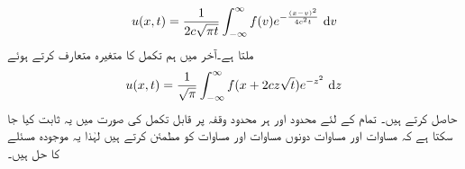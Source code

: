 \begin{align}\label{مساوات_جزوی_لامتناہی_سلاخ_حل_الف}
u(x,t)=\frac{1}{2c\sqrt{\pi t}}\int_{-\infty}^{\infty}f(v)e^{-\frac{(x-v)^2}{4c^2t}}\,\dif v
\end{align}
ملتا ہے۔آخر میں ہم تکمل کا متغیرہ  متعارف  کرتے ہوئے 
\begin{align}\label{مساوات_جزوی_لامتناہی_سلاخ_حل_ب}
u(x,t)=\frac{1}{\sqrt{\pi}}\int_{-\infty}^{\infty} f(x+2cz\sqrt{t})e^{-z^2}\,\dif z
\end{align}
حاصل کرتے ہیں۔ تمام  کے لئے محدود   اور ہر محدود وقفہ پر قابل تکمل  کی صورت میں  یہ ثابت کیا جا سکتا ہے کہ  مساوات  اور مساوات  دونوں  مساوات  اور مساوات  کو مطمئن کرتے ہیں لہٰذا یہ موجودہ مسئلے کا حل ہیں۔

